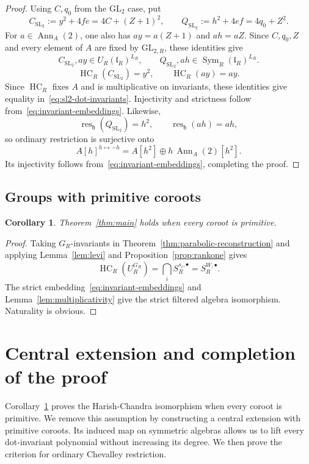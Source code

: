 \documentclass[twoside,a4paper,12pt,reqno]{amsart}
\newtheorem{corollary}[theorem]{Corollary}
\theoremstyle{remark}
\numberwithin{equation}{section}
\newcommand{\fh}{\mathfrak h}
\newcommand{\fl}{\mathfrak l}
\DeclareMathOperator{\Sym}{Sym}
\DeclareMathOperator{\HC}{HC}
\DeclareMathOperator{\Ann}{Ann}
\begin{document}
\begin{proof}
Using \(C,q_0\) from the \(\mathrm{GL}_2\) case, put
\[
C_{\mathrm{SL}_2}:=y^2+4fe=4C+(Z+1)^2,\qquad
Q_{\mathrm{SL}_2}:=h^2+4ef=4q_0+Z^2.
\]
For \(a\in\Ann_A(2)\), one also has \(ay=a(Z+1)\) and \(ah=aZ\).
Since \(C,q_0,Z\) and every element of \(A\) are fixed by
\(\mathrm{GL}_{2,R}\), these identities give
\[
C_{\mathrm{SL}_2},ay\in U_R(\fl_R)^{L_R},\qquad
Q_{\mathrm{SL}_2},ah\in\Sym_R(\fl_R)^{L_R}.
\]
\[
\HC_R(C_{\mathrm{SL}_2})=y^2,\qquad \HC_R(ay)=ay.
\]
Since \(\HC_R\) fixes \(A\) and is multiplicative on invariants,
these identities give equality in~\eqref{eq:sl2-dot-invariants}.
Injectivity and strictness follow
from~\eqref{eq:invariant-embeddings}.
Likewise,
\[
\operatorname{res}_{\fh}(Q_{\mathrm{SL}_2})=h^2,\qquad
\operatorname{res}_{\fh}(ah)=ah,
\]
so ordinary restriction is surjective onto
\[
A[h]^{h\mapsto-h}
=A[h^2]\oplus h\,\Ann_A(2)[h^2].
\]
Its injectivity follows from~\eqref{eq:invariant-embeddings},
completing the proof.
\end{proof}

\subsection{Groups with primitive coroots}

\begin{corollary}\label{cor:primitive}
Theorem~\ref{thm:main} holds when every coroot is primitive.
\end{corollary}
\begin{proof}
Taking \(G_R\)-invariants in Theorem~\ref{thm:parabolic-reconstruction}
and applying Lemma~\ref{lem:levi} and Proposition~\ref{prop:rankone} gives
\[
\HC_R(U_R^{G_R})=\bigcap_i S_R^{s_i,\bullet}=S_R^{W,\bullet}.
\]
The strict embedding~\eqref{eq:invariant-embeddings} and
Lemma~\ref{lem:multiplicativity} give the strict filtered algebra
isomorphism. Naturality is obvious.
\end{proof}

\section{Central extension and completion of the proof}\label{sec:completion}

Corollary~\ref{cor:primitive} proves the Harish-Chandra isomorphism
when every coroot is primitive. We remove this assumption by constructing
a central extension with primitive coroots. Its induced map on symmetric
algebras allows us to lift every dot-invariant polynomial without
increasing its degree. We then prove the criterion for ordinary
Chevalley restriction.
\end{document}
